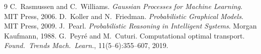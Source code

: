 \documentclass[11pt]{article}
\begin{document}
\begin{thebibliography}{9}
 C.~Rasmussen and C.~Williams.
\emph{Gaussian Processes for Machine Learning}. MIT Press, 2006.
 D.~Koller and N.~Friedman. \emph{Probabilistic
Graphical Models}. MIT Press, 2009.
 J.~Pearl. \emph{Probabilistic Reasoning in
Intelligent Systems}. Morgan Kaufmann, 1988.
 G.~Peyr\'e and M.~Cuturi. Computational optimal
transport. \emph{Found.\ Trends Mach.\ Learn.}, 11(5--6):355--607,
2019.
\end{thebibliography}
\end{document}
